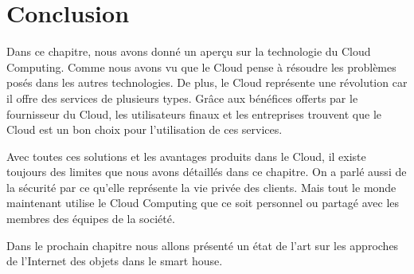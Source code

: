 \section{Conclusion}
Dans ce chapitre, nous avons donné un aperçu sur la technologie du Cloud Computing. Comme nous avons vu que le Cloud pense à résoudre les problèmes posés dans les autres technologies. De plus, le Cloud représente une révolution car il offre des services de plusieurs types. Grâce aux bénéfices offerts par le fournisseur du Cloud, les utilisateurs finaux et les entreprises trouvent que le Cloud est un bon choix pour l’utilisation de ces services. 


Avec toutes ces solutions et les avantages produits dans le Cloud, il existe toujours des limites que nous avons détaillés dans ce chapitre. On a parlé aussi de la sécurité par ce qu’elle représente la vie privée des clients. Mais tout le monde maintenant utilise le Cloud Computing que ce soit personnel ou partagé avec les membres des équipes de la société.


Dans le prochain chapitre nous allons présenté un état de l’art sur les approches de l’Internet des objets  dans le smart house.
